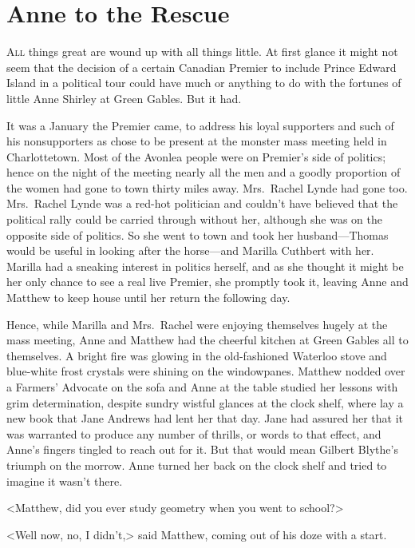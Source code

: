 \chapter{Anne to the Rescue}
	
\lettrine{A}{ll} things great are wound up with all things little. At first glance it might not seem that the decision of a certain Canadian Premier to include Prince Edward Island in a political tour could have much or anything to do with the fortunes of little Anne Shirley at Green Gables. But it had.

It was a January the Premier came, to address his loyal supporters and such of his nonsupporters as chose to be present at the monster mass meeting held in Charlottetown. Most of the Avonlea people were on Premier's side of politics; hence on the night of the meeting nearly all the men and a goodly proportion of the women had gone to town thirty miles away. Mrs.~Rachel Lynde had gone too. Mrs.~Rachel Lynde was a red-hot politician and couldn't have believed that the political rally could be carried through without her, although she was on the opposite side of politics. So she went to town and took her husband—Thomas would be useful in looking after the horse—and Marilla Cuthbert with her. Marilla had a sneaking interest in politics herself, and as she thought it might be her only chance to see a real live Premier, she promptly took it, leaving Anne and Matthew to keep house until her return the following day.

Hence, while Marilla and Mrs.~Rachel were enjoying themselves hugely at the mass meeting, Anne and Matthew had the cheerful kitchen at Green Gables all to themselves. A bright fire was glowing in the old-fashioned Waterloo stove and blue-white frost crystals were shining on the windowpanes. Matthew nodded over a Farmers' Advocate on the sofa and Anne at the table studied her lessons with grim determination, despite sundry wistful glances at the clock shelf, where lay a new book that Jane Andrews had lent her that day. Jane had assured her that it was warranted to produce any number of thrills, or words to that effect, and Anne's fingers tingled to reach out for it. But that would mean Gilbert Blythe's triumph on the morrow. Anne turned her back on the clock shelf and tried to imagine it wasn't there.

<Matthew, did you ever study geometry when you went to school?>

<Well now, no, I didn't,> said Matthew, coming out of his doze with a start.

